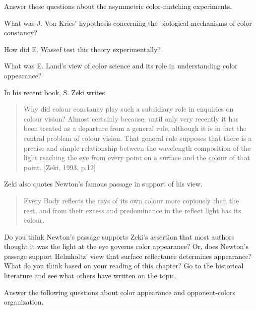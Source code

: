  \ee

 \ee

\item Answer these questions about the asymmetric color-matching
experiments. 

 \be

 \item What was J. Von Kries' hypothesis concerning the
biological mechanisms of color constancy?

 \item How did E. Wassef test this theory experimentally?

 \item What was E. Land's view of color science and its role in
 understanding color appearance?

 \item In his recent book, S. Zeki writes

\begin{quote}
Why did colour constancy play such a subsidiary role in enquiries on
colour vision?  Almost certainly because, until only very recently it
has been treated as a departure from a general rule, although it is in
fact the central problem of colour vision.  That general rule supposes
that there is a precise and simple relationship between the wavelength
composition of the light reaching the eye from every point on a
surface and the colour of that point. [Zeki, 1993, p.12]
\end{quote}

Zeki also quotes Newton's famous passage in support of his view.

\begin{quote}
Every Body reflects the rays of its own colour more copiously than the
rest, and from their excess and predominance in the reflect light has
its colour.
\end{quote}

Do you think Newton's passage supports Zeki's assertion that most
authors thought it was the light at the eye governs color appearance?
Or, does Newton's passage support Helmholtz' view that surface
reflectance determines appearance?  What do you think based on your
reading of this chapter?  Go to the historical literature and see what
others have written on the topic.

 \ee

\item Answer the following questions about color appearance and 
opponent-colors organization.

 \be

